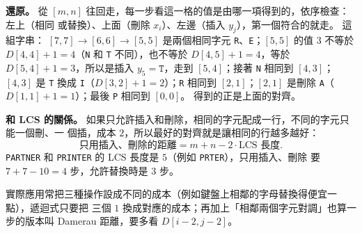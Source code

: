 \begin{center}
\begin{minipage}{\linewidth}
\label{fig:dp-edit-table}
\end{minipage}
\end{center}

\textbf{還原。} 從 $[m, n]$ 往回走，每一步看這一格的值是由哪一項得到的，依序檢查：左上（相同
或替換）、上面（刪除 $x_i$）、左邊（插入 $y_j$），第一個符合的就走。 這組字串：
$[7,7] \to [6,6] \to [5,5]$ 是兩個相同字元 \texttt{R}、\texttt{E}；$[5,5]$ 的值 $3$ 不等於
$D[4,4] + 1 = 4$（\texttt{N} 和 \texttt{T} 不同），也不等於 $D[4,5] + 1 = 4$，等於
$D[5,4] + 1 = 3$，所以是插入 $y_5 = \texttt{T}$，走到 $[5, 4]$；接著 \texttt{N} 相同到 $[4,3]$；
$[4,3]$ 是 \texttt{T} 換成 \texttt{I}（$D[3,2] + 1 = 2$）；\texttt{R} 相同到 $[2,1]$；$[2,1]$
是刪除 \texttt{A}（$D[1,1] + 1 = 1$）；最後 \texttt{P} 相同到 $[0,0]$。 得到的正是上面的對齊。

\textbf{和 LCS 的關係。} 如果只允許插入和刪除，相同的字元配成一行，不同的字元只能一個刪、一
個插，成本 $2$，所以最好的對齊就是讓相同的行越多越好：
\[
\text{只用插入、刪除的距離} = m + n - 2 \cdot \text{LCS 長度} .
\]
\texttt{PARTNER} 和 \texttt{PRINTER} 的 LCS 長度是 $5$（例如 \texttt{PRTER}），只用插入、刪除
要 $7 + 7 - 10 = 4$ 步，允許替換時是 $3$ 步。

實際應用常把三種操作設成不同的成本（例如鍵盤上相鄰的字母替換得便宜一點），遞迴式只要把
三個 $1$ 換成對應的成本；再加上「相鄰兩個字元對調」也算一步的版本叫 Damerau 距離，要多看
$D[i-2, j-2]$。

